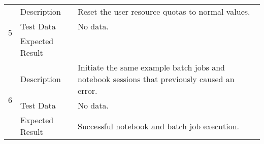 \begin{longtable}[]{p{1.3cm}p{2cm}p{13cm}}
            \multirow{3}{*}{ 5 } & Description &
            \begin{minipage}[t]{13cm}{\footnotesize
            Reset the user resource quotas to normal values.

            \vspace{\dp0}
            } \end{minipage} \\ \cline{2-3}
            & Test Data &
            \begin{minipage}[t]{13cm}{\footnotesize
                No data.
                \vspace{\dp0}
            } \end{minipage} \\ \cline{2-3}
            & Expected Result &
        \\ \midrule

            \multirow{3}{*}{ 6 } & Description &
            \begin{minipage}[t]{13cm}{\footnotesize
            Initiate the same example batch jobs and notebook sessions that
previously caused an error.

            \vspace{\dp0}
            } \end{minipage} \\ \cline{2-3}
            & Test Data &
            \begin{minipage}[t]{13cm}{\footnotesize
                No data.
                \vspace{\dp0}
            } \end{minipage} \\ \cline{2-3}
            & Expected Result &
                \begin{minipage}[t]{13cm}{\footnotesize
                Successful notebook and batch job execution.

                \vspace{\dp0}
                } \end{minipage}
        \\ \midrule


\end{longtable}

